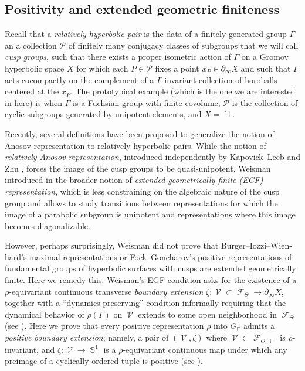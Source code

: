 \documentclass{amsart}
\theoremstyle{plain}
\theoremstyle{definition}
\DeclareMathOperator{\Fc}{\mathcal{F}}
\DeclareMathOperator{\Vc}{\mathcal{V}}
\DeclareMathOperator{\Fb}{{\mathbb{F}}}
\DeclareMathOperator{\Hb}{\mathbb{H}}
\DeclareMathOperator{\Sb}{\mathbb{S}}
\newcommand*\from{\colon}
\newcommand{\1}{\mathbf{1}}
\begin{document}
\subsection{Positivity and extended geometric finiteness}

Recall that a \emph{relatively hyperbolic pair} is the data of a finitely generated group $\Gamma$ an a collection $\mathcal P$ of finitely many conjugacy classes of subgroups that we will call \emph{cusp groups}, such that there exists a proper isometric action of $\Gamma$ on a Gromov hyperbolic space $X$ for which each $P\in \mathcal P$ fixes a point $x_P \in \partial_\infty X$ and such that $\Gamma$ acts cocompactly on the complement of a $\Gamma$-invariant collection of horoballs centered at the $x_P$. The prototypical example (which is the one we are interested in here) is when $\Gamma$ is a Fuchsian group with finite covolume, $\mathcal P$ is the collection of cyclic subgroups generated by unipotent elements, and $X= \Hb$.

Recently, several definitions have been proposed to generalize the notion of Anosov representation to relatively hyperbolic pairs. While the notion of \emph{relatively Anosov representation}, introduced independently by Kapovick--Leeb \cite{KL} and Zhu \cite{Zhu}, forces the image of the cusp groups to be quasi-unipotent, Weisman introduced in \cite{Weisman} the broader notion of \emph{extended geometrically finite (EGF) representation}, which is less constraining on the algebraic nature of the cusp group and allows to study transitions between representations for which the image of a parabolic subgroup is unipotent and representations where this image becomes diagonalizable.

However, perhaps surprisingly, Weisman did not prove that Burger--Iozzi--Wien-hard's maximal representations or Fock--Goncharov's positive representations of fundamental groups of hyperbolic surfaces with cusps are extended geometrically finite. Here we remedy this. Weisman's EGF condition asks for the existence of a $\rho$-equivariant continuous transverse \emph{boundary extension} $\zeta\from \Vc \subset \Fc_\Theta \to \partial_\infty X$, together with a ``dynamics preserving'' condition informally requiring that the dynamical behavior of $\rho(\Gamma)$ on $\Vc$ extends to some open neighborhood in $\Fc_\Theta$ (see ). Here we prove that every positive representation $\rho$ into $G_{\Fb}$ admits a \emph{positive boundary extension}; namely, a pair of $(\Vc, \zeta)$ where $\Vc\subset \Fc_{\Theta,\Fb}$ is $\rho$-invariant, and $\zeta: \Vc\to \Sb^1$ is a $\rho$-equivariant continuous map under which any preimage of a cyclically ordered tuple is positive (see ).
\end{document}

